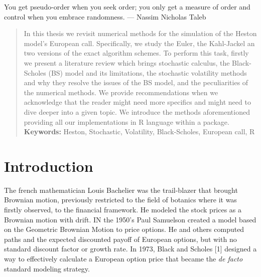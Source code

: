\documentclass[12pt,oneside]{reedthesis}
\theoremstyle{definition}
\theoremstyle{definition}
\theoremstyle{remark}
\begin{document}
\begin{acknowledgements}

      You get pseudo-order when you seek order; you only get a measure of
      order and control when you embrace randomness. --- Nassim Nicholas Taleb
    \end{acknowledgements}
  
      \hypersetup{linkcolor=black}
    \setcounter{tocdepth}{2}
    \tableofcontents
  
      \listoftables
  
      \listoffigures
      \begin{abstract}
      In this thesis we revisit numerical methods for the simulation of the
      Heston model's European call. Specifically, we study the Euler, the
      Kahl-Jackel an two versions of the exact algorithm schemes. To perform
      this task, firstly we present a literature review which brings
      stochastic calculus, the Black-Scholes (BS) model and its limitations,
      the stochastic volatility methods and why they resolve the issues of the
      BS model, and the peculiarities of the numerical methods. We provide
      recommendations when we acknowledge that the reader might need more
      specifics and might need to dive deeper into a given topic. We introduce
      the methods aforementioned providing all our implementations in R
      language within a package. \newline \newline \textbf{Keywords:} Heston,
      Stochastic, Volatility, Black-Scholes, European call, R
    \end{abstract}
  
  \mainmatter %
  \pagestyle{fancyplain} %

  \newcommand{\source}[1]{\caption*{Source: {#1}} }
  
  
  
  \chapter{Introduction}\label{intro}
  
  The french mathematician Louis Bachelier was the trail-blazer that
  brought Brownian motion, previously restricted to the field of botanics
  where it was firstly observed, to the financial framework. He modeled
  the stock prices as a Brownian motion with drift. IN the 1950's Paul
  Samuelson created a model based on the Geometric Brownian Motion to
  price options. He and others computed paths and the expected discounted
  payoff of European options, but with no standard discount factor or
  growth rate. In 1973, Black and Scholes {[}1{]} designed a way to
  effectively calculate a European option price that became the \emph{de
  facto} standard modeling strategy.
  
\end{document}
